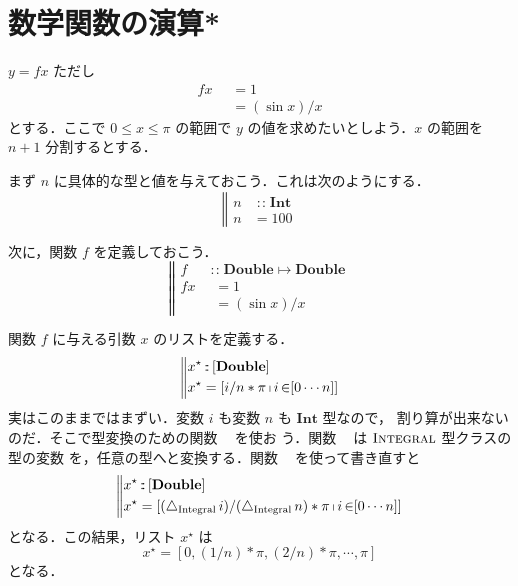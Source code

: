 \documentclass[a5paper,twoside,fleqn,draft]{jsbook}
\newcommand{\mBrace}{\Vert}
\newcommand{\mKeyword}[1]{\mathsf{#1}}
\newcommand{\mOtherwiseKeyword}{\mKeyword{otherwise}}
\DeclareMathOperator{\mOtherwise}{\mOtherwiseKeyword}
\newcommand{\mUpCast}{\bigtriangleup}
\DeclareMathOperator{\mFromIntegral}{\mUpCast_\text{Integral}}
\DeclareMathOperator{\mFrom}{\in}
\DeclareMathOperator{\mIn}{{:\!:}}
\DeclareMathOperator{\mMapsTo}{\mapsto}
\newcommand{\mType}[1]{\mathbf{#1}} %
\newcommand{\mDoubleType}{\mType{Double}}
\newcommand{\mIntType}{\mType{Int}}
\newcommand{\mTypeClass}[1]{\textsc{#1}} %
\newcommand{\mIntegralTypeClass}{\mTypeClass{Integral}}
\newcommand{\mList}[1]{{#1}^\mathrm{\star}}
\newcommand{\mGuard}[1]{\mathop{\mid_{#1}}}
\DeclareMathOperator{\mListComp}{\shortmid}
\newcommand{\mProjEXP}[2]{#1\mMapsTo#2} %
\begin{document}
\section{数学関数の演算*}

$y=fx$ ただし
\begin{equation}
\begin{aligned}
fx&\mGuard{x\equiv0}=1\\
&\mGuard{\mOtherwise}=(\sin x)/x
\end{aligned}
\end{equation}
とする．ここで $0\le x\le\pi$ の範囲で $y$ の値を求めたいとしよう．$x$
の範囲を $n+1$ 分割するとする．

まず $n$ に具体的な型と値を与えておこう．これは次のようにする．
\begin{equation}
\left\mBrace
\begin{aligned}
n&\mIn\mIntType\\
n&=100
\end{aligned}
\right.
\end{equation}

次に，関数 $f$ を定義しておこう．
\begin{equation}
\left\mBrace
\begin{aligned}
f&\mIn\mProjEXP{\mDoubleType}{\mDoubleType}\\
fx&\mGuard{x\equiv0}=1\\
&\mGuard{\mOtherwise}=(\sin x)/x
\end{aligned}
\right.
\end{equation}

関数 $f$ に与える引数 $x$ のリストを定義する．
\begin{equation*}
  \left\mBrace
  \begin{aligned}
    \mList{x}
    &\mIn{}[\mDoubleType]\\
    \mList{x}
    &=[i/n*\pi\mListComp i\mFrom[0\dotsb n]]
  \end{aligned}
  \right.
\end{equation*}
実はこのままではまずい．変数 $i$ も変数 $n$ も $\mIntType$ 型なので，
割り算が出来ないのだ．そこで型変換のための関数 $\mFromIntegral$ を使お
う．関数 $\mFromIntegral$ は $\mIntegralTypeClass$ 型クラスの型の変数
を，任意の型へと変換する．関数 $\mFromIntegral$ を使って書き直すと
\begin{equation}
  \left\mBrace
  \begin{aligned}
    \mList{x}
    &\mIn{}[\mDoubleType]\\
    \mList{x}
    &=[(\mFromIntegral i)/(\mFromIntegral n)*\pi\mListComp i\mFrom[0\dotsb n]]
  \end{aligned}
  \right.
\end{equation}
となる．この結果，リスト $\mList{x}$ は
\begin{equation}
  \mList{x}
  =[0,(1/n)*\pi,(2/n)*\pi,\dotsb,\pi]
\end{equation}
となる．
\end{document}
